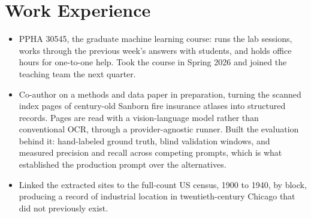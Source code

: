 \newcommand{\cvtitle}{Applied Economist and Data Scientist\protect\\[2pt]\large\mdseries Building the Data Policy Questions Need}










\section{Work Experience}

\begin{itemize}
  \item PPHA 30545, the graduate machine learning course: runs the lab sessions, works through the previous week's answers with students, and holds office hours for one-to-one help. Took the course in Spring 2026 and joined the teaching team the next quarter.
\end{itemize}

\vspace{1.5pt}

\begin{itemize}
  \item Co-author on a methods and data paper in preparation, turning the scanned index pages of century-old Sanborn fire insurance atlases into structured records. Pages are read with a vision-language model rather than conventional OCR, through a provider-agnostic runner. Built the evaluation behind it: hand-labeled ground truth, blind validation windows, and measured precision and recall across competing prompts, which is what established the production prompt over the alternatives.
  \item Linked the extracted sites to the full-count US census, 1900 to 1940, by block, producing a record of industrial location in twentieth-century Chicago that did not previously exist.
\end{itemize}

\vspace{1.5pt}

